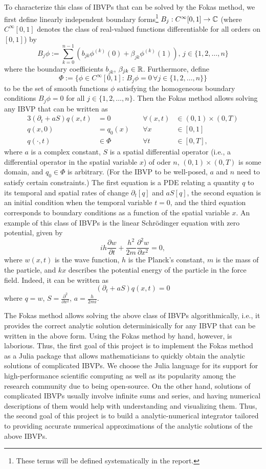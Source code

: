 \documentclass[11pt, oneside, a4paper]{article}
\begin{document}
To characterize this class of IBVPs that can be solved by the Fokas method\cite[p.9]{Smith2016}, we first define linearly independent boundary forms\footnote{These terms will be defined systematically in the report.} $B_j: C^\infty[0,1]\to \mathbb C$ (where $C^\infty[0,1]$ denotes the class of real-valued functions differentiable for all orders on $[0,1]$) by
\[B_j\phi := \sum_{k=0}^{n-1}\left(b_{jk}\phi^{(k)}(0) + \beta_{jk}\phi^{(k)}(1)\right),\, j\in\{1,2,\ldots,n\}\]
where the boundary coefficients $b_{jk}$, $\beta_{jk}\in\mathbb R$. Furthermore, define
\[\Phi:=\{\phi\in C^\infty[0,1]:\, B_j\phi = 0\,\forall j\in\{1,2,\ldots,n\}\}\]
to be the set of smooth functions $\phi$ satisfying the homogeneous boundary conditions $B_j\phi=0$ for all $j\in\{1,2,\ldots,n\}$.
Then the Fokas method allows solving any IBVP that can be written as
\begin{alignat*}{3}
    (\partial_t + aS)q(x,t) &= 0\quad &\forall (x,t)&\in (0,1)\times (0,T)\\
    q(x,0) &= q_0(x)\quad &\forall x&\in [0,1]\\
    q(\cdot, t) &\in \Phi \quad &\forall t&\in [0,T],
\end{alignat*}
where $a$ is a complex constant, $S$ is a spatial differential operator (i.e., a differential operator in the spatial variable $x$) of oder $n$, $(0,1)\times (0,T)$ is some domain, and $q_0\in \Phi$ is arbitrary. (For the IBVP to be well-posed, $a$ and $n$ need to satisfy certain constraints.) The first equation is a PDE relating a quantity $q$ to its temporal and spatial rates of change $\partial_t[q]$ and $aS[q]$, the second equation is an initial condition when the temporal variable $t=0$, and the third equation corresponds to boundary conditions as a function of the spatial variable $x$. 
An example of this class of IBVPs is the linear Schr\"{o}dinger equation with zero potential, given by
\[ih\frac{\partial w}{\partial t} + \frac{h^2}{2m}\frac{\partial^2 w}{\partial x^2} = 0,\]
where $w(x,t)$ is the wave function, $h$ is the Planck's constant, $m$ is the mass of the particle, and $kx$ describes the potential energy of the particle in the force field. Indeed, it can be written as
\[(\partial_t + aS)q(x,t) = 0\]
where $q=w$, $S = \frac{\partial^2}{\partial x^2}$, $a = \frac{h}{2mi}$. 

The Fokas method allows solving the above class of IBVPs algorithmically, i.e., it provides the correct analytic solution determinisically for any IBVP that can be written in the above form. Using the Fokas method by hand, however, is laborious. Thus, the first goal of this project is to implement the Fokas method as a Julia package that allows mathematicians to quickly obtain the analytic solutions of complicated IBVPs. We choose the Julia language for its support for high-performance scientific computing as well as its popularity among the research community due to being open-source. On the other hand, solutions of complicated IBVPs usually involve infinite sums and series, and having numerical descriptions of them would help with understanding and visualizing them. Thus, the second goal of this project is to build a analytic-numerical integrator tailored to providing accurate numerical approximations of the analytic solutions of the above IBVPs.
\end{document}
